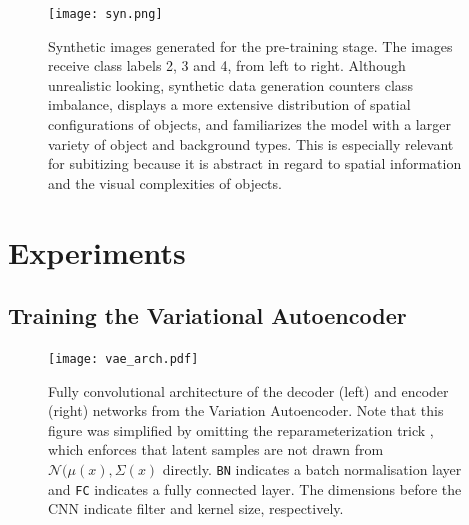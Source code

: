 \documentclass[twocolumn]{article}
\begin{document}
\begin{figure}
\centering
\texttt{[image: syn.png]}
\caption{Synthetic images generated for the pre-training stage. The images receive class labels 2, 3 and 4, from left to right. Although unrealistic looking, synthetic data generation counters class imbalance, displays a more extensive distribution of spatial configurations of objects, and familiarizes the model with a larger variety of object and background types. This is especially relevant for subitizing because it is abstract in regard to spatial information and the visual complexities of objects.}
\label{fig:syn}
\end{figure}

\hypertarget{experiments}{%
\section{Experiments}\label{experiments}}

\hypertarget{vae-train}{%
\subsection{Training the Variational Autoencoder} \label{vae-train}}

\begin{figure}
\centering
\texttt{[image: vae\_arch.pdf]}
\caption{Fully convolutional architecture of the decoder (left) and encoder (right) networks from the Variation Autoencoder. Note that this figure was simplified by omitting the reparameterization trick \citep{kingma2013auto}, which enforces that latent samples are not drawn from \(\mathcal{N}(\mu(x), \Sigma(x)\) directly. \texttt{BN} indicates a batch normalisation layer \citep{ioffe2015batch} and \texttt{FC} indicates a fully connected layer. The dimensions before the CNN indicate filter and kernel size, respectively.}
\label{fig:vae-arch}
\end{figure}
\end{document}
